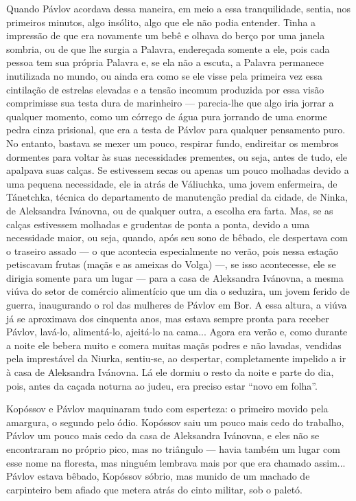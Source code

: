 Quando Pávlov acordava dessa maneira, em meio a essa tranquilidade,
sentia, nos primeiros minutos, algo insólito, algo que ele não podia
entender. Тinha a impressão de que era novamente um bebê e olhava do
berço por uma janela sombria, ou de que lhe surgia a Palavra, endereçada
somente a ele, pois cada pessoa tem sua própria Palavra e, se ela não a
escuta, a Palavra permanece inutilizada no mundo, ou ainda era como se
ele visse pela primeira vez essa cintilação dе estrelas elevadas e a
tensão incomum produzida por essa visão comprimisse sua testa dura de
marinheiro --- parecia-lhe que algo iria jorrar a qualquer momento, como
um córrego de água pura jorrando de uma enorme pedra cinza prisional,
que era a testa de Pávlov para qualquer pensamento puro. No entanto,
bastava se mexer um pouco, respirar fundo, endireitar os membros
dormentes para voltar às suas necessidades prementes, ou seja, antes de
tudo, ele apalpava suas calças. Se estivessem secas ou apenas um pouco
molhadas devido a uma pequena necessidade, ele ia atrás de Váliuchka,
uma jovem enfermeira, de Tánetchka, técnica do departamento de
manutenção predial da cidade, de Ninka, de Aleksandra Ivánovna, ou de
qualquer outra, a escolha era farta. Mas, se as calças estivessem
molhadas e grudentas de ponta a ponta, devido a uma necessidade maior,
ou seja, quando, após seu sono de bêbado, ele despertava com o traseiro
assado --- o que acontecia especialmente no verão, pois nessa estação
petiscavam frutas (maçãs e as ameixas do Volga) ---, se isso
acontecesse, ele se dirigia somente para um lugar --- para a casa de
Aleksandra Ivánovna, a mesma viúva do setor de comércio alimentício que
um dia o seduzira, um jovem ferido de guerra, inaugurando o rol das
mulheres de Pávlov em Bor. A essa altura, a viúva já se aproximava dos
cinquenta anos, mas estava sempre pronta para receber Pávlov, lavá-lo,
alimentá-lo, ajeitá-lo na cama... Agora era verão e, como durante a
noite ele bebera muito e comera muitas maçãs podres e não lavadas,
vendidas pela imprestável da Niurka, sentiu-se, ao despertar,
completamente impelido a ir à casa de Aleksandra Ivánovna. Lá ele dormiu
o resto da noite e parte do dia, pois, antes da caçada noturna ao judeu,
era preciso estar ``novo em folha''.

Kopóssov e Pávlov maquinaram tudo com esperteza: o primeiro movido pela
amargura, o segundo pelo ódio. Kopóssov saiu um pouco mais cedo do
trabalho, Pávlov um pouco mais cedo da casa de Aleksandra Ivánovna, e
eles não se encontraram no próprio pico, mas no triângulo --- havia
também um lugar com esse nome na floresta, mas ninguém lembrava mais por
que era chamado assim... Pávlov estava bêbado, Kopóssov sóbrio, mas
munido de um machado de carpinteiro bem afiado que metera atrás do cinto
militar, sob o paletó.

